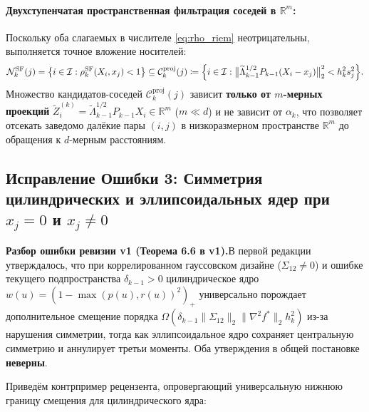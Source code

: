 \documentclass[11pt,a4paper]{article}
\newcommand{\R}{\mathbb{R}}
\newcommand{\II}{\mathcal{I}}
\theoremstyle{definition}
\theoremstyle{remark}
\newcommand{\auditbox}[2]{%
  \vspace{6pt}\noindent\colorbox{warnbg}{%
    \parbox{\dimexpr\textwidth-2\fboxsep\relax}{%
      \vspace{4pt}\textbf{\color{accent}#1.}\hspace{0.4em}#2\vspace{4pt}%
    }%
  }\vspace{6pt}%
}
\begin{document}
\paragraph{Двухступенчатая пространственная фильтрация соседей в $\R^m$:}
Поскольку оба слагаемых в числителе \eqref{eq:rho_riem} неотрицательны, выполняется точное вложение носителей:
\begin{equation}\label{eq:cyl_filter}
    \mathcal{N}_k^{\mathrm{SF}}(j) = \bigl\{i \in \II : \rho_k^{\mathrm{SF}}(X_i, x_j) < 1\bigr\} \subseteq \mathcal{C}_k^{\mathrm{proj}}(j) \coloneqq \Bigl\{i \in \II : \bigl\|\widetilde{\Lambda}_{k-1}^{1/2} P_{k-1}(X_i - x_j)\bigr\|_2^2 < h_k^2 s_j^2\Bigr\}.
\end{equation}
Множество кандидатов-соседей $\mathcal{C}_k^{\mathrm{proj}}(j)$ зависит \textbf{только от $m$-мерных проекций} $\widetilde{Z}_i^{(k)} = \widetilde{\Lambda}_{k-1}^{1/2} P_{k-1} X_i \in \R^m$ ($m \ll d$) и не зависит от $\alpha_k$, что позволяет отсекать заведомо далёкие пары $(i,j)$ в низкоразмерном пространстве $\R^m$ до обращения к $d$-мерным расстояниям.

\subsection{Исправление Ошибки 3: Симметрия цилиндрических и эллипсоидальных ядер при $x_j = 0$ и $x_j \neq 0$}

\auditbox{Разбор ошибки ревизии v1 (Теорема 6.6 в v1)}{В первой редакции утверждалось, что при коррелированном гауссовском дизайне ($\Sigma_{12} \neq 0$) и ошибке текущего подпространства $\delta_{k-1} > 0$ цилиндрическое ядро $w(u) = (1 - \max(p(u), r(u))^2)_+$ универсально порождает дополнительное смещение порядка $\Omega(\delta_{k-1}\|\Sigma_{12}\|_2 \|\nabla^2 f^*\|_2 h_k^2)$ из-за нарушения симметрии, тогда как эллипсоидальное ядро сохраняет центральную симметрию и аннулирует третьи моменты. Оба утверждения в общей постановке \textbf{неверны}.}

Приведём контрпример рецензента, опровергающий универсальную нижнюю границу смещения для цилиндрического ядра:
\end{document}

